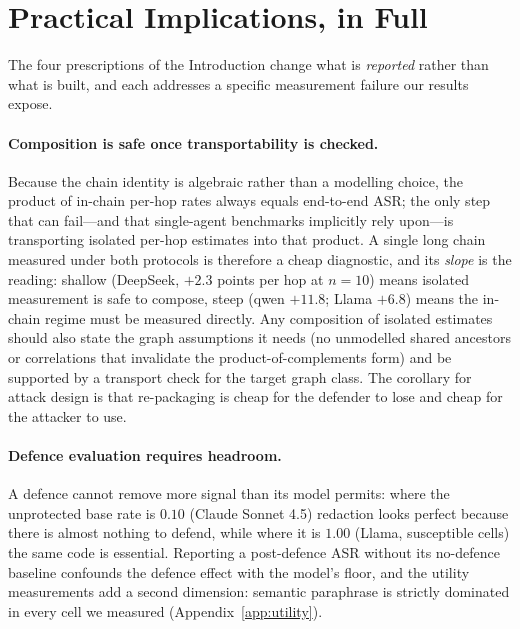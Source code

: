 \documentclass[sigconf,anonymous]{aamas}
\begin{document}
\section{Practical Implications, in Full}
\label{app:discussion}

The four prescriptions of the Introduction change what is \emph{reported} rather than
what is built, and each addresses a specific measurement failure our results expose.

\paragraph{Composition is safe once transportability is checked.} Because the chain
identity is algebraic rather than a modelling choice, the product of in-chain per-hop
rates always equals end-to-end ASR; the only step that can fail---and that single-agent
benchmarks implicitly rely upon---is transporting isolated per-hop estimates into that
product. A single long chain measured under both protocols is therefore a cheap
diagnostic, and its \emph{slope} is the reading: shallow (DeepSeek, $+2.3$ points per
hop at $n = 10$) means isolated measurement is safe to compose, steep (qwen $+11.8$;
Llama $+6.8$) means the in-chain regime must be measured directly. Any composition of
isolated estimates should also state the graph assumptions it needs (no unmodelled
shared ancestors or correlations that invalidate the product-of-complements form) and
be supported by a transport check for the target graph class. The corollary for attack
design is that re-packaging is cheap for the defender to lose and cheap for the
attacker to use.

\paragraph{Defence evaluation requires headroom.} A defence cannot remove more signal
than its model permits: where the unprotected base rate is $0.10$ (Claude Sonnet 4.5)
redaction looks perfect because there is almost nothing to defend, while where it is
$1.00$ (Llama, susceptible cells) the same code is essential. Reporting a post-defence
ASR without its no-defence baseline confounds the defence effect with the model's
floor, and the utility measurements add a second dimension: semantic paraphrase is
strictly dominated in every cell we measured (Appendix~\ref{app:utility}).
\end{document}
